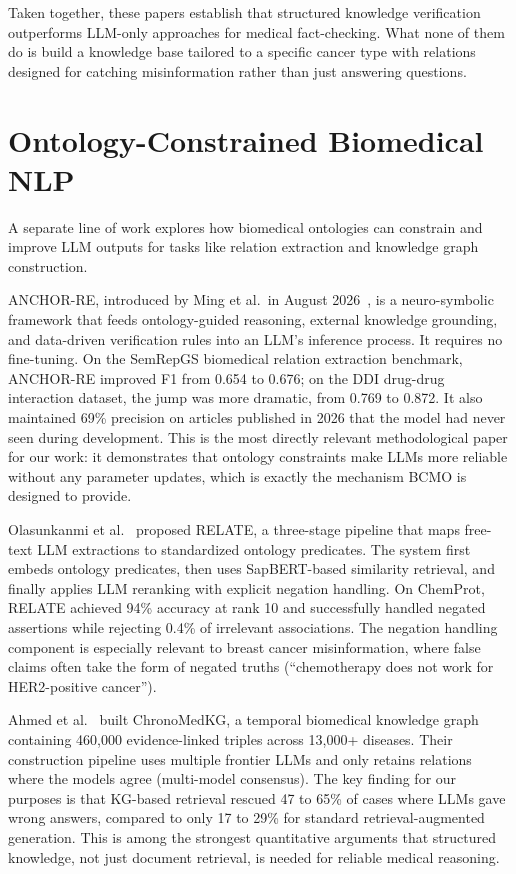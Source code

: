 \documentclass[11pt,a4paper]{article}
\begin{document}
Taken together, these papers establish that structured knowledge verification outperforms LLM-only approaches for medical fact-checking. What none of them do is build a knowledge base tailored to a specific cancer type with relations designed for catching misinformation rather than just answering questions.

\section{Ontology-Constrained Biomedical NLP}

A separate line of work explores how biomedical ontologies can constrain and improve LLM outputs for tasks like relation extraction and knowledge graph construction.

ANCHOR-RE, introduced by Ming et al.\ in August 2026~\cite{ming2026anchor}, is a neuro-symbolic framework that feeds ontology-guided reasoning, external knowledge grounding, and data-driven verification rules into an LLM's inference process. It requires no fine-tuning. On the SemRepGS biomedical relation extraction benchmark, ANCHOR-RE improved F1 from 0.654 to 0.676; on the DDI drug-drug interaction dataset, the jump was more dramatic, from 0.769 to 0.872. It also maintained 69\% precision on articles published in 2026 that the model had never seen during development. This is the most directly relevant methodological paper for our work: it demonstrates that ontology constraints make LLMs more reliable without any parameter updates, which is exactly the mechanism BCMO is designed to provide.

Olasunkanmi et al.~\cite{olasunkanmi2025relate} proposed RELATE, a three-stage pipeline that maps free-text LLM extractions to standardized ontology predicates. The system first embeds ontology predicates, then uses SapBERT-based similarity retrieval, and finally applies LLM reranking with explicit negation handling. On ChemProt, RELATE achieved 94\% accuracy at rank 10 and successfully handled negated assertions while rejecting 0.4\% of irrelevant associations. The negation handling component is especially relevant to breast cancer misinformation, where false claims often take the form of negated truths (``chemotherapy does not work for HER2-positive cancer'').

Ahmed et al.~\cite{ahmed2026chronomedkg} built ChronoMedKG, a temporal biomedical knowledge graph containing 460,000 evidence-linked triples across 13,000+ diseases. Their construction pipeline uses multiple frontier LLMs and only retains relations where the models agree (multi-model consensus). The key finding for our purposes is that KG-based retrieval rescued 47 to 65\% of cases where LLMs gave wrong answers, compared to only 17 to 29\% for standard retrieval-augmented generation. This is among the strongest quantitative arguments that structured knowledge, not just document retrieval, is needed for reliable medical reasoning.
\end{document}
